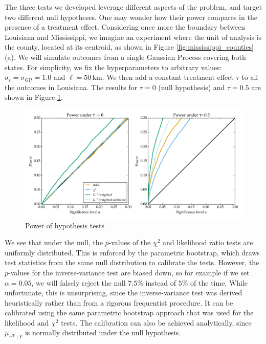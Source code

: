 \documentclass[letter]{article}
\makeatletter
\def\maxwidth{\ifdim\Gin@nat@width>\linewidth\linewidth
\else\Gin@nat@width\fi}
\let\Oldincludegraphics\includegraphics
\renewcommand{\includegraphics}[1]{\Oldincludegraphics[width=.8\maxwidth]{#1}}
\newcommand{\sigmaf}{\sigma_{\mathrm{GP}}}
\newcommand{\sigman}{\sigma_{\epsilon}}
\newcommand{\invvar}{\tau^{IV}}
\makeatother
\begin{document}
The three tests we developed leverage different aspects of the problem, and target two different null hypotheses. One may wonder how their power compares in the presence of a treatment effect. Considering once more the boundary between Louisiana and Mississippi, we imagine an experiment where the unit of analysis is the county, located at its centroid, as shown in Figure \ref{fig:mississippi_counties}(a).
We will simulate outcomes from a single Gaussian Process covering both states. For simplicity, we fix the hyperparameters to arbitrary values: \(\sigman=\sigmaf=1.0\) and \(\ell=50\,\mathrm{km}\). We then add a constant treatment effect \(\tau\) to all the outcomes in Louisiana. The results for \(\tau=0\) (null hypothesis) and \(\tau=0.5\) are shown in Figure \ref{fig:power}.

\begin{figure}
\centering
\includegraphics{figures/power_HT.png}
\caption{\label{fig:power} Power of hypothesis tests}
\end{figure}

We see that under the null, the \(p\)-values of the \(\chi^2\) and likelihood ratio tests are uniformly distributed. This is enforced by the parametric bootstrap, which draws test statistics from the same null distribution to calibrate the tests. However, the \(p\)-values for the inverse-variance test are biased down, so for example if we set \(\alpha=0.05\), we will falsely reject the null \(7.5\%\) instead of \(5\%\) of the time. While unfortunate, this is unsurprising, since the inverse-variance test was derived heuristically rather than from a rigorous frequentist procedure. It can be calibrated using the same parametric bootstrap approach that was used for the likelihood and \(\chi^2\) tests. The calibration can also be achieved analytically, since \(\mu_{\invvar \mid Y}\) is normally distributed under the null hypothesis.
\end{document}
